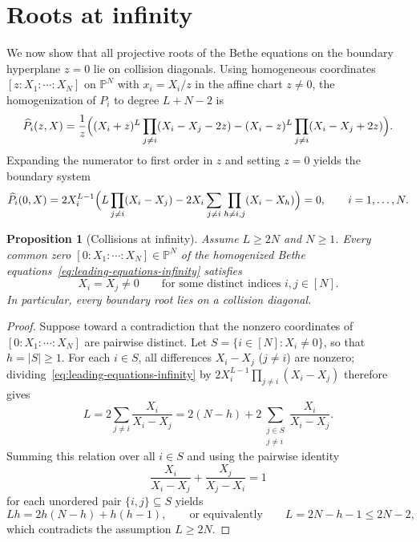 \documentclass[11pt]{article}
\newtheorem{proposition}{Proposition}[section]
\theoremstyle{definition}
\begin{document}
\section{Roots at infinity}
\label{sec:general-infinity}

We now show that all projective roots of the Bethe equations on the boundary hyperplane $z=0$ lie on collision diagonals.
Using homogeneous coordinates $[z:X_1:\cdots:X_N]$ on $\mathbb{P}^N$ with
$x_i=X_i/z$ in the affine chart $z\ne 0$, the homogenization of $P_i$ to
degree $L+N-2$ is
\[
 \widehat{P}_i(z,X)=\frac{1}{z}\Bigl(
 (X_i+z)^L\prod_{j\ne i}(X_i-X_j-2z)
 -(X_i-z)^L\prod_{j\ne i}(X_i-X_j+2z)\Bigr).
\]
Expanding the numerator to first order in $z$ and setting $z=0$ yields the boundary
system
\begin{equation}\label{eq:leading-equations-infinity}
 \widehat{P}_i(0,X)=2X_i^{L-1}\Bigl(
 L\prod_{j\ne i}(X_i-X_j)
 -2X_i\sum_{j\ne i}\prod_{h\ne i,j}(X_i-X_h)
 \Bigr)=0,\qquad i=1,\ldots,N.
\end{equation}

\begin{proposition}[Collisions at infinity]
\label{prop:collisions-infinity}
Assume $L\ge 2N$ and $N\ge 1$. Every common zero
$[0:X_1:\cdots:X_N]\in\mathbb{P}^N$ of the homogenized Bethe equations~\eqref{eq:leading-equations-infinity} satisfies
\[
 X_i=X_j\ne 0
 \qquad\text{for some distinct indices }i,j\in[N].
\]
In particular, every boundary root lies on a collision diagonal.
\end{proposition}

\begin{proof}
Suppose toward a contradiction that the nonzero coordinates of $[0:X_1:\cdots:X_N]$ are pairwise distinct. Let
$S=\{i\in[N]:X_i\ne 0\}$, so that $h=|S|\ge 1$. For each $i\in S$, all differences
$X_i-X_j$ ($j\ne i$) are nonzero; dividing~\eqref{eq:leading-equations-infinity} by
$2X_i^{L-1}\prod_{j\ne i}(X_i-X_j)$ therefore gives
\[
 L=2\sum_{j\ne i}\frac{X_i}{X_i-X_j}
   =2(N-h)+2\sum_{\substack{j\in S\\j\ne i}}
                         \frac{X_i}{X_i-X_j}.
\]
Summing this relation over all $i\in S$ and using the pairwise identity
\[
 \frac{X_i}{X_i-X_j}+\frac{X_j}{X_j-X_i}=1
\]
for each unordered pair $\{i,j\}\subseteq S$ yields
\[
 Lh=2h(N-h)+h(h-1),\qquad\text{or equivalently}\qquad
 L=2N-h-1\le 2N-2,
\]
which contradicts the assumption $L\ge 2N$.
\end{proof}
\end{document}
